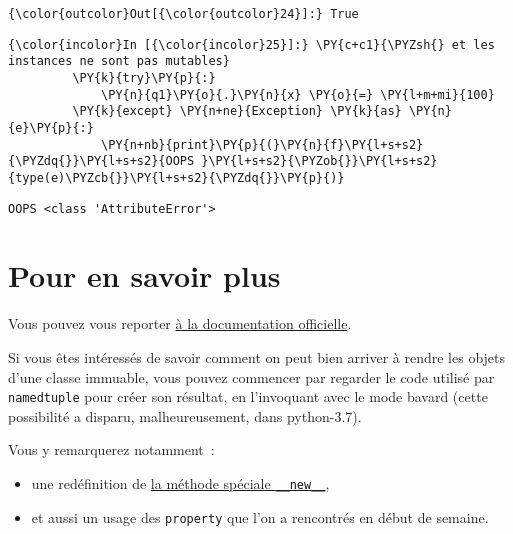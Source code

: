 \begin{Verbatim}[commandchars=\\\{\},frame=single,framerule=0.3mm,rulecolor=\color{cellframecolor}]
{\color{outcolor}Out[{\color{outcolor}24}]:} True
\end{Verbatim}
            
    \begin{Verbatim}[commandchars=\\\{\},frame=single,framerule=0.3mm,rulecolor=\color{cellframecolor}]
{\color{incolor}In [{\color{incolor}25}]:} \PY{c+c1}{\PYZsh{} et les instances ne sont pas mutables}
         \PY{k}{try}\PY{p}{:}
             \PY{n}{q1}\PY{o}{.}\PY{n}{x} \PY{o}{=} \PY{l+m+mi}{100}
         \PY{k}{except} \PY{n+ne}{Exception} \PY{k}{as} \PY{n}{e}\PY{p}{:}
             \PY{n+nb}{print}\PY{p}{(}\PY{n}{f}\PY{l+s+s2}{\PYZdq{}}\PY{l+s+s2}{OOPS }\PY{l+s+s2}{\PYZob{}}\PY{l+s+s2}{type(e)\PYZcb{}}\PY{l+s+s2}{\PYZdq{}}\PY{p}{)}
\end{Verbatim}


    \begin{Verbatim}[commandchars=\\\{\},frame=single,framerule=0.3mm,rulecolor=\color{cellframecolor}]
OOPS <class 'AttributeError'>
\end{Verbatim}

    \hypertarget{pour-en-savoir-plus}{%
\section{Pour en savoir plus}\label{pour-en-savoir-plus}}

    Vous pouvez vous reporter
\href{https://docs.python.org/3/library/collections.html\#collections.namedtuple}{à
la documentation officielle}.

    Si vous êtes intéressés de savoir comment on peut bien arriver à rendre
les objets d'une classe immuable, vous pouvez commencer par regarder le
code utilisé par \texttt{namedtuple} pour créer son résultat, en
l'invoquant avec le mode bavard (cette possibilité a disparu,
malheureusement, dans python-3.7).

Vous y remarquerez notamment~:

\begin{itemize}
\item
  une redéfinition de
  \href{https://docs.python.org/3/reference/datamodel.html\#object.__new__}{la
  méthode spéciale \texttt{\_\_new\_\_}},
\item
  et aussi un usage des \texttt{property} que l'on a rencontrés en début
  de semaine.
\end{itemize}

